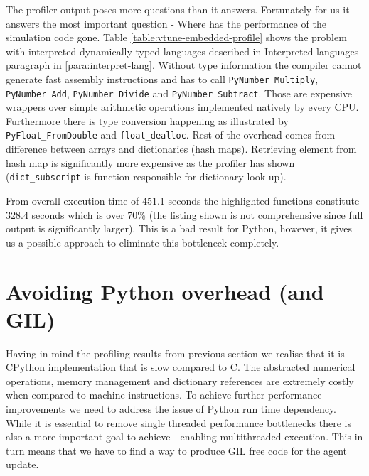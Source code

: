 \documentclass[12pt, a4paper]{report}
\begin{document}
The profiler output poses more questions than it answers. Fortunately for us
it answers the most important question - Where has the performance of the simulation
code gone. Table \ref{table:vtune-embedded-profile} shows the problem with
interpreted dynamically typed languages described in Interpreted languages
paragraph in \ref{para:interpret-lang}. Without type information the compiler
cannot generate fast assembly instructions and has to call
\lstinline{PyNumber_Multiply}, \lstinline{PyNumber_Add}, \lstinline{PyNumber_Divide}
and \lstinline{PyNumber_Subtract}. Those are expensive wrappers over simple arithmetic
operations implemented natively by every CPU. Furthermore there is type conversion
happening as illustrated by \lstinline{PyFloat_FromDouble} and \lstinline{float_dealloc}.
Rest of the overhead comes from difference between arrays and dictionaries (hash maps).
Retrieving element from hash map is significantly more expensive as the profiler has
shown (\lstinline{dict_subscript} is function responsible for dictionary look up).

From overall execution time of 451.1 seconds the highlighted functions constitute 328.4
seconds which is over 70\% (the listing shown is not comprehensive since full output
is significantly larger). This is a bad result for Python, however, it gives
us a possible approach to eliminate this bottleneck completely.

\section{Avoiding Python overhead (and GIL)}\label{sec:embed-c++}
Having in mind the profiling results from previous section we realise that
it is CPython implementation that is slow compared to C. The abstracted numerical
operations, memory management and dictionary references are extremely costly
when compared to machine instructions. To achieve further performance
improvements we need to address the issue of Python run time dependency.
While it is essential to remove single threaded performance bottlenecks there is
also a more important goal to achieve - enabling multithreaded execution. This
in turn means that we have to find a way to produce GIL free code for the
agent update.
\end{document}
